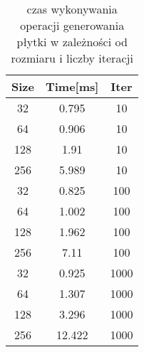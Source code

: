 \begin{table}[ht]
\centering
\begin{tabular}{|c|c|c|}
\hline
Size & Time[ms] & Iter \\ \hline
32  &0.795 &10 \\ \hline
64  &0.906 &10\\ \hline
128 &1.91  &10\\ \hline
256 &5.989 &10\\ \hline
32  &0.825 &100\\ \hline
64  &1.002 &100\\ \hline
128 &1.962 &100\\ \hline
256 &7.11  &100\\ \hline
32  &0.925 &1000\\ \hline
64  &1.307 &1000\\ \hline
128 &3.296 &1000\\ \hline
256 &12.422&  1000\\ \hline
\end{tabular}
\caption{czas wykonywania operacji generowania płytki w zależności od rozmiaru i liczby iteracji}
\label{tab:tab}
\end{table}